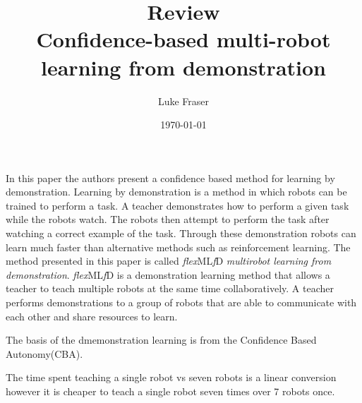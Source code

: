 \documentclass{article}
\begin{document}
\title{{\large Review} \\ Confidence-based multi-robot learning from demonstration}
\author{Luke Fraser}
\date{\today}
\maketitle

\begingroup
\renewcommand{\section}[2]{}


\endgroup

\section*{Summary}
In this paper the authors present a confidence based method for learning by demonstration. Learning by demonstration is a method in which robots can be trained to perform a task. A teacher demonstrates how to perform a given task while the robots watch. The robots then attempt to perform the task after watching a correct example of the task. Through these demonstration robots can learn much faster than alternative methods such as reinforcement learning. The method presented in this paper is called \emph{flex}ML\emph{f}D \emph{multirobot learning from demonstration}. \emph{flex}ML\emph{f}D is a demonstration learning method that allows a teacher to teach multiple robots at the same time collaboratively. A teacher performs demonstrations to a group of robots that are able to communicate with each other and share resources to learn.

The basis of the dmemonstration learning is from the Confidence Based Autonomy(CBA).

\section*{Strengths}

\section*{Critique}
The time spent teaching a single robot vs seven robots is a linear conversion however it is cheaper to teach a single robot seven times over 7 robots once.
\cite{chernova2010confidence}
\end{document}
